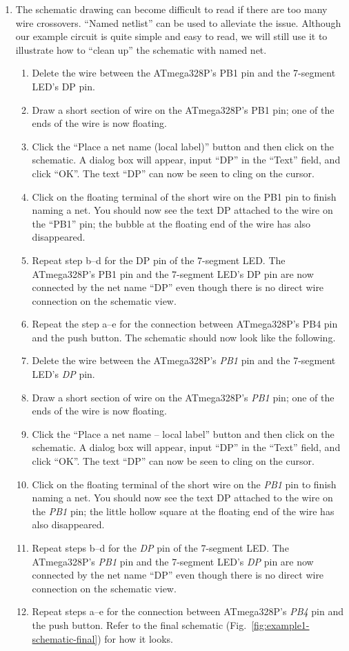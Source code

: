 \documentclass[12pt,letterpaper]{scrartcl}
\begin{document}
\begin{enumerate}
	\item The schematic drawing can become difficult to read if there are too many wire crossovers. ``Named netlist'' can be used to alleviate the issue. Although our example circuit is quite simple and easy to read, we will still use it to illustrate how to ``clean up'' the schematic with named net.
		\begin{enumerate}
			\item Delete the wire between the ATmega328P’s PB1 pin and the 7-segment LED’s DP pin.
			\item Draw a short section of wire on the ATmega328P’s PB1 pin; one of the ends of the wire is now floating. 
			\item Click the ``Place a net name (local label)'' button and then click on the schematic. A dialog box will appear, input ``DP'' in the ``Text'' field, and click ``OK''. The text ``DP'' can now be seen to cling on the cursor. 
			\item Click on the floating terminal of the short wire on the PB1 pin to finish naming a net. You should now see the text DP attached to the wire on the ``PB1'' pin; the bubble at the floating end of the wire has also disappeared. 
			\item Repeat step b--d for the DP pin of the 7-segment LED. 
			The ATmega328P’s PB1 pin and the 7-segment LED’s DP pin are now connected by the net name ``DP'' even though there is no direct wire connection on the schematic view. 
			\item Repeat the step a--e for the connection between ATmega328P’s PB4 pin and the push button. The schematic should now look like the following.  
			\item Delete the wire between the ATmega328P's \emph{PB1} pin and the 7-segment LED's \emph{DP} pin. 
			\item Draw a short section of wire on the ATmega328P's \emph{PB1} pin; one of the ends of the wire is now floating. 
			\item Click the ``Place a net name -- local label'' button and then click on the schematic. A dialog box will appear, input ``DP'' in the ``Text'' field, and click ``OK''. The text ``DP'' can now be seen to cling on the cursor. 
			\item Click on the floating terminal of the short wire on the \emph{PB1} pin to finish naming a net. You should now see the text DP attached to the wire on the \emph{PB1} pin; the little hollow square at the floating end of the wire has also disappeared. 
			\item Repeat steps b--d for the \emph{DP} pin of the 7-segment LED. The ATmega328P's \emph{PB1} pin and the 7-segment LED's \emph{DP} pin are now connected by the net name ``DP'' even though there is no direct wire connection on the schematic view. 
			\item Repeat steps a--e for the connection between ATmega328P's \emph{PB4} pin and the push button. Refer to the final schematic (Fig.~\ref{fig:example1-schematic-final}) for how it looks.  
		\end{enumerate}
	

\end{enumerate}
\end{document}
